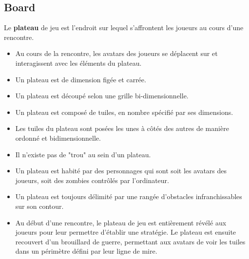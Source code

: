 \subsection{Board}
Le \textbf{plateau} de jeu est l'endroit sur lequel s'affrontent les joueurs au cours d'une rencontre.
    \begin{itemize}
        \item Au cours de la rencontre, les avatars des joueurs se déplacent sur et interagissent avec les éléments du plateau.
        \item Un plateau est de dimension figée et carrée.
        \item Un plateau est découpé selon une grille bi-dimensionnelle.
        \item Un plateau est composé de tuiles, en nombre spécifié par ses dimensions.
        \item Les tuiles du plateau sont posées les unes à côtés des autres de manière ordonné et bidimensionnelle.
        \item Il n'existe pas de "trou" au sein d'un plateau.
        \item Un plateau est habité par des personnages qui sont soit les avatars des joueurs, soit des zombies contrôlés par l'ordinateur.
        \item Un plateau est toujours délimité par une rangée d'obstacles infranchissables sur son contour.
        \item Au début d'une rencontre, le plateau de jeu est entièrement révélé aux joueurs pour leur permettre d'établir une stratégie. Le plateau est ensuite recouvert d'un brouillard de guerre, permettant aux avatars de voir les tuiles dans un périmètre défini par leur ligne de mire.
    \end{itemize}
    
